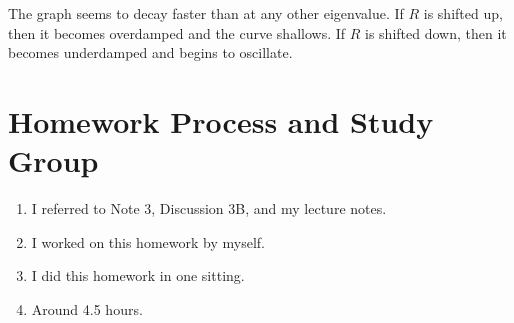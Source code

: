 \documentclass[]{article}
\begin{document}
\begin{center}
\end{center}
The graph seems to decay faster than at any other eigenvalue.
If \(R\) is shifted up, then it becomes overdamped and the curve shallows.
If \(R\) is shifted down, then it becomes underdamped and begins to oscillate.


\section{Homework Process and Study Group}

\begin{enumerate}
	\item I referred to Note 3, Discussion 3B, and my lecture notes.
	\item I worked on this homework by myself.
	\item I did this homework in one sitting.
	\item Around 4.5 hours.
\end{enumerate}

\newpage

%
\end{document}
